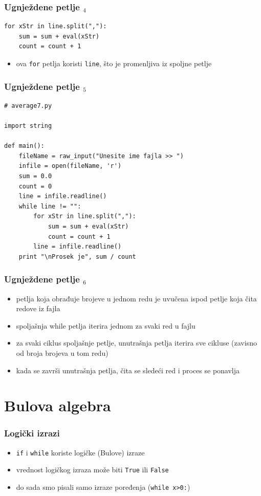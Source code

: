 \documentclass[utf8,compress]{beamer}
\begin{document}
\begin{frame}[fragile]
  \frametitle{Ugnježdene petlje $_4$}
\begin{verbatim}
for xStr in line.split(","):
    sum = sum + eval(xStr)
    count = count + 1
\end{verbatim}
  \begin{itemize}
    \item ova \texttt{for} petlja koristi \texttt{line}, što je promenljiva iz spoljne petlje
  \end{itemize}
\end{frame}

\begin{frame}[fragile,shrink=5]
  \frametitle{Ugnježdene petlje $_5$}
\begin{verbatim}
# average7.py

import string

def main():
    fileName = raw_input("Unesite ime fajla >> ")
    infile = open(fileName, 'r')
    sum = 0.0
    count = 0
    line = infile.readline()
    while line != "":
        for xStr in line.split(","):
            sum = sum + eval(xStr)
            count = count + 1
        line = infile.readline()
    print "\nProsek je", sum / count

\end{verbatim}
\end{frame}

\begin{frame}[fragile]
  \frametitle{Ugnježdene petlje $_6$}
  \begin{itemize}
    \item petlja koja obrađuje brojeve u jednom redu je uvučena ispod petlje koja čita redove iz fajla
    \item spoljašnja while petlja iterira jednom za svaki red u fajlu
    \item za svaki ciklus spoljašnje petlje, unutrašnja petlja iterira sve cikluse (zavisno od broja brojeva u tom redu)
    \item kada se završi unutrašnja petlja, čita se sledeći red i proces se ponavlja
  \end{itemize}
\end{frame}

\section{Bulova algebra}

\begin{frame}[fragile]
  \frametitle{Logički izrazi}
  \begin{itemize}
    \item \texttt{if} i \texttt{while} koriste logičke (Bulove) izraze
    \item vrednost logičkog izraza može biti \texttt{True} ili \texttt{False}
    \item do sada smo pisali samo izraze poređenja (\texttt{while x>0:})
  \end{itemize}
\end{frame}
\end{document}
